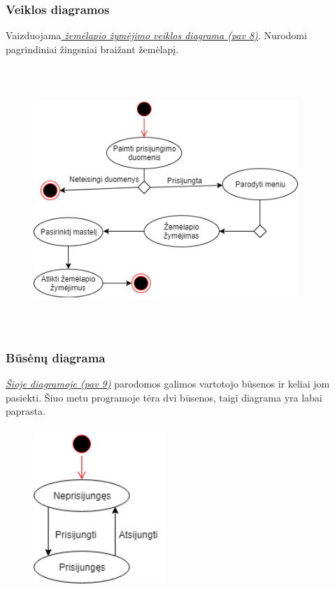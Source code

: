 \documentclass[oneside]{VUMIFPSkursinis}
\begin{document}
\subsubsection{Veiklos diagramos}
	Vaizduojama\hyperref[fig:ActivityMapŽimėjimas]{\textit{ žemėlapio žymėjimo veiklos diagrama (pav 8)}}. Nurodomi pagrindiniai žingsniai braižant žemėlapį.
	\vskip 0.5cm
	\begin{figure}[H]
	\centering	
	\includegraphics[width=10cm,height=10cm,keepaspectratio]{ActivityMapŽimėjimas.png}
	\caption{}
	\label{fig:ActivityMapŽimėjimas}
\end{figure}

	
\subsubsection{Būsėnų diagrama}
 \hyperref[fig:Busenu]{\textit{Šioje diagramoje (pav 9)}} parodomos galimos vartotojo būsenos ir keliai jom pasiekti. Šiuo metu programoje tėra dvi būsenos, taigi diagrama yra labai paprasta.
	\begin{figure}[H]
	\centering	
	\includegraphics[width=5cm,height=6cm,keepaspectratio]{Busenu.png}
	\caption{}
	\label{fig:Busenu}
\end{figure}
\pagebreak
\end{document}
